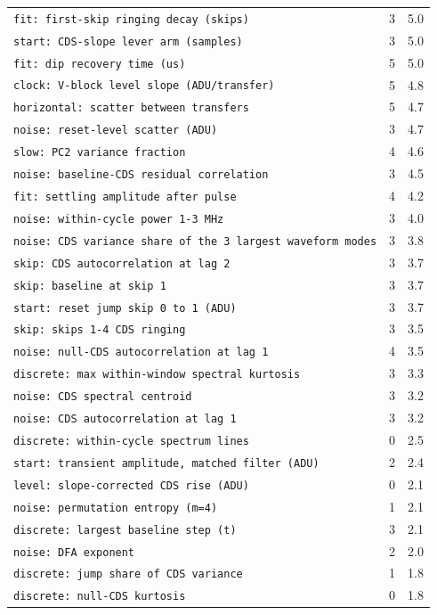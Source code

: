 \documentclass[10pt]{article}
\renewcommand{\_}{\oldunderscore\allowbreak}
\begin{document}
\begin{longtable}{>{\raggedright\arraybackslash}p{}rr}
\texttt{fit: first-skip ringing decay (skips)} & 3 & 5.0 \\
\texttt{start: CDS-slope lever arm (samples)} & 3 & 5.0 \\
\texttt{fit: dip recovery time (us)} & 5 & 5.0 \\
\texttt{clock: V-block level slope (ADU/transfer)} & 5 & 4.8 \\
\texttt{horizontal: scatter between transfers} & 5 & 4.7 \\
\texttt{noise: reset-level scatter (ADU)} & 3 & 4.7 \\
\texttt{slow: PC2 variance fraction} & 4 & 4.6 \\
\texttt{noise: baseline-CDS residual correlation} & 3 & 4.5 \\
\texttt{fit: settling amplitude after pulse} & 4 & 4.2 \\
\texttt{noise: within-cycle power 1-3 MHz} & 3 & 4.0 \\
\texttt{noise: CDS variance share of the 3 largest waveform modes} & 3 & 3.8 \\
\texttt{skip: CDS autocorrelation at lag 2} & 3 & 3.7 \\
\texttt{skip: baseline at skip 1} & 3 & 3.7 \\
\texttt{start: reset jump skip 0 to 1 (ADU)} & 3 & 3.7 \\
\texttt{skip: skips 1-4 CDS ringing} & 3 & 3.5 \\
\texttt{noise: null-CDS autocorrelation at lag 1} & 4 & 3.5 \\
\texttt{discrete: max within-window spectral kurtosis} & 3 & 3.3 \\
\texttt{noise: CDS spectral centroid} & 3 & 3.2 \\
\texttt{noise: CDS autocorrelation at lag 1} & 3 & 3.2 \\
\texttt{discrete: within-cycle spectrum lines} & 0 & 2.5 \\
\texttt{start: transient amplitude, matched filter (ADU)} & 2 & 2.4 \\
\texttt{level: slope-corrected CDS rise (ADU)} & 0 & 2.1 \\
\texttt{noise: permutation entropy (m=4)} & 1 & 2.1 \\
\texttt{discrete: largest baseline step (t)} & 3 & 2.1 \\
\texttt{noise: DFA exponent} & 2 & 2.0 \\
\texttt{discrete: jump share of CDS variance} & 1 & 1.8 \\
\texttt{discrete: null-CDS kurtosis} & 0 & 1.8 \\

\end{longtable}
\end{document}
